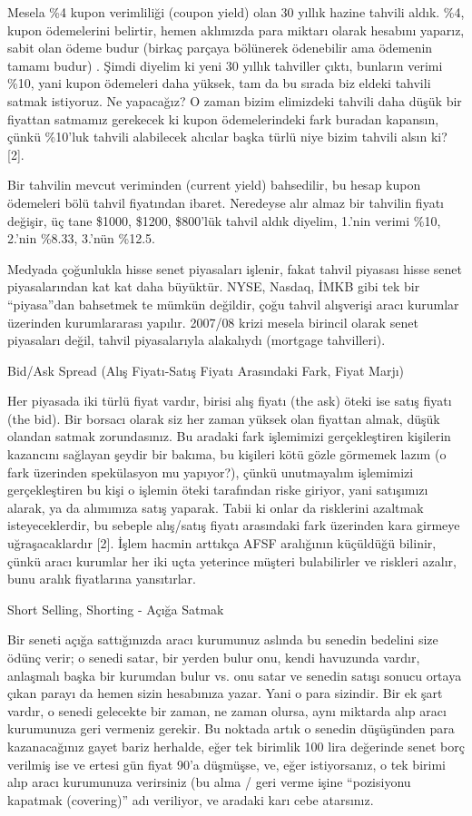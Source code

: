 \documentclass[12pt,fleqn]{article}\usepackage{../../common}
\begin{document}
Mesela \%4 kupon verimliliği (coupon yield) olan 30 yıllık hazine tahvili
aldık. \%4, kupon ödemelerini belirtir, hemen aklımızda para miktarı olarak
hesabını yaparız, sabit olan ödeme budur (birkaç parçaya bölünerek ödenebilir
ama ödemenin tamamı budur) . Şimdi diyelim ki yeni 30 yıllık tahviller çıktı,
bunların verimi \%10, yani kupon ödemeleri daha yüksek, tam da bu sırada biz
eldeki tahvili satmak istiyoruz. Ne yapacağız?  O zaman bizim elimizdeki tahvili
daha düşük bir fiyattan satmamız gerekecek ki kupon ödemelerindeki fark buradan
kapansın, çünkü \%10'luk tahvili alabilecek alıcılar başka türlü niye bizim
tahvili alsın ki?  [2].

Bir tahvilin mevcut veriminden (current yield) bahsedilir, bu hesap kupon
ödemeleri bölü tahvil fiyatından ibaret. Neredeyse alır almaz bir tahvilin
fiyatı değişir, üç tane \$1000, \$1200, \$800'lük tahvil aldık diyelim,
1.'nin verimi \%10, 2.'nin \%8.33, 3.'nün \%12.5.

Medyada çoğunlukla hisse senet piyasaları işlenir, fakat tahvil piyasası
hisse senet piyasalarından kat kat daha büyüktür. NYSE, Nasdaq, İMKB gibi
tek bir ``piyasa''dan bahsetmek te mümkün değildir, çoğu tahvil alışverişi
aracı kurumlar üzerinden kurumlararası yapılır. 2007/08 krizi mesela birincil
olarak senet piyasaları değil, tahvil piyasalarıyla alakalıydı (mortgage
tahvilleri).

Bid/Ask Spread (Alış Fiyatı-Satış Fiyatı Arasındaki Fark, Fiyat Marjı)

Her piyasada iki türlü fiyat vardır, birisi alış fiyatı (the ask) öteki ise
satış fiyatı (the bid). Bir borsacı olarak siz her zaman yüksek olan fiyattan
almak, düşük olandan satmak zorundasınız. Bu aradaki fark işlemimizi
gerçekleştiren kişilerin kazancını sağlayan şeydir bir bakıma, bu kişileri kötü
gözle görmemek lazım (o fark üzerinden spekülasyon mu yapıyor?), çünkü
unutmayalım işlemimizi gerçekleştiren bu kişi o işlemin öteki tarafından riske
giriyor, yani satışımızı alarak, ya da alımımıza satış yaparak. Tabii ki onlar
da risklerini azaltmak isteyeceklerdir, bu sebeple alış/satış fiyatı arasındaki
fark üzerinden kara girmeye uğraşacaklardır [2]. İşlem hacmin arttıkça AFSF
aralığının küçüldüğü bilinir, çünkü aracı kurumlar her iki uçta yeterince
müşteri bulabilirler ve riskleri azalır, bunu aralık fiyatlarına yansıtırlar. 

Short Selling, Shorting - Açığa Satmak

Bir seneti açığa sattığınızda aracı kurumunuz aslında bu senedin bedelini
size ödünç verir; o senedi satar, bir yerden bulur onu, kendi havuzunda
vardır, anlaşmalı başka bir kurumdan bulur vs. onu satar ve senedin satışı
sonucu ortaya çıkan parayı da hemen sizin hesabınıza yazar. Yani o para
sizindir. Bir ek şart vardır, o senedi gelecekte bir zaman, ne zaman
olursa, aynı miktarda alıp aracı kurumunuza geri vermeniz gerekir. Bu
noktada artık o senedin düşüşünden para kazanacağınız gayet bariz herhalde,
eğer tek birimlik 100 lira değerinde senet borç verilmiş ise ve ertesi gün
fiyat 90'a düşmüşse, ve, eğer istiyorsanız, o tek birimi alıp aracı
kurumunuza verirsiniz (bu alma / geri verme işine ``pozisiyonu kapatmak
(covering)'' adı veriliyor, ve aradaki karı cebe atarsınız.
\end{document}
